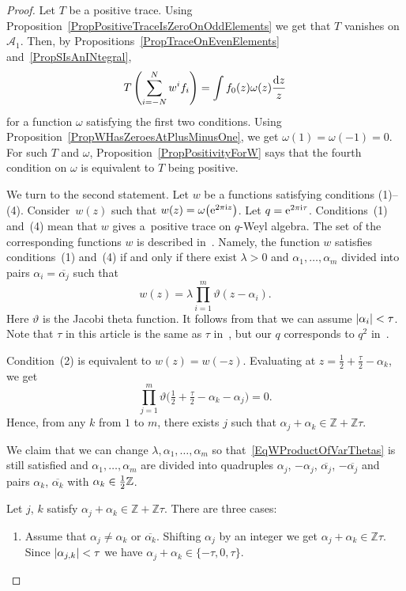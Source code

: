 \documentclass[pdftex]{sigma}
\newcommand\ZZ{\mathbb{Z}}
\let\Re\relax
\DeclareMathOperator\Re{Re}
\let\Im\relax
\DeclareMathOperator\Im{Im}
\newcommand{\mc}{\mathcal}
\newcommand{\ovl}{\overline}
\numberwithin{equation}{section}
\theoremstyle{definition}
\begin{document}
 \begin{proof}
 Let $T$ be a positive trace. Using Proposition~\ref{PropPositiveTraceIsZeroOnOddElements} we get that $T$ vanishes on $\mc{A}_1$. Then, by Propositions~\ref{PropTraceOnEvenElements} and~\ref{PropSIsAnINtegral},
 \[T\left(\sum_{i=-N}^N w^i f_i\right)=\int f_0(z)\omega(z)\frac{{\rm d}z}{z}\] for a function $\omega$ satisfying the first two conditions. Using Proposition~\ref{PropWHasZeroesAtPlusMinusOne}, we get $\omega(1)={\omega(-1)=0}$. For such $T$ and $\omega$, Proposition~\ref{PropPositivityForW} says that the fourth condition on $\omega$ is equivalent to $T$ being positive.

 We turn to the second statement. Let $w$ be a functions satisfying conditions (1)--(4). Consider~$w(z)$ such that $w(z)=\omega\bigl({\rm e}^{2\pi {\rm i} z}\bigr)$. Let $q={\rm e}^{2\pi {\rm i}\tau}$. Conditions~(1) and~(4) mean that $w$ gives a~positive trace on $q$-Weyl algebra. The set of the corresponding functions $w$ is described in~\cite[Theorem~3.7]{KQWeyl}. Namely, the function $w$ satisfies conditions~(1) and~(4) if and only if there exist $\lambda>0$ and $\alpha_1,\ldots, \alpha_m$ divided into pairs $\alpha_i=\ovl{\alpha_j}$ such that
 \begin{equation}
 \label{EqWProductOfVarThetas}
 w(z)=\lambda\prod_{i=1}^m \vartheta(z-\alpha_i).
 \end{equation} Here $\vartheta$ is the Jacobi theta function. It follows from \cite[Lemma 3.6]{KQWeyl} that we can assume $\lvert\Im\alpha_i\rvert<\Im\tau$. Note that $\tau$ in this article is the same as $\tau$ in~\cite{KQWeyl}, but our $q$ corresponds to $q^2$ in~\cite{KQWeyl}.

Condition~(2) is equivalent to $w(z)=w(-z)$. Evaluating at $z=\tfrac12+\tfrac{\tau}{2}-\alpha_k$, we get
\[
\prod_{j=1}^m \vartheta\bigl(\tfrac12+\tfrac{\tau}{2}-\alpha_k-\alpha_j\bigr)=0.
\]
 Hence, from any $k$ from $1$ to $m$, there exists $j$ such that $\alpha_j+\alpha_k\in \ZZ+\ZZ\tau$.

We claim that we can change $\lambda,\alpha_1,\ldots,\alpha_m$ so that~\eqref{EqWProductOfVarThetas} is still satisfied and $\alpha_1,\ldots,\alpha_m$ are divided into quadruples $\alpha_j$, $-\alpha_j$, $\ovl{\alpha_j}$, $-\ovl{\alpha_j}$ and pairs $\alpha_k$, $\ovl{\alpha_k}$ with $\Re\alpha_k\in\tfrac12\ZZ$.

 Let $j$, $k$ satisfy $\alpha_j+\alpha_k\in \ZZ+\ZZ\tau$. There are three cases:
 \begin{enumerate}\itemsep=0pt
 \item[$(1)$]
Assume that $\alpha_j\neq \alpha_k$ or $\ovl{\alpha_k}$. Shifting $\alpha_j$ by an integer we get $\alpha_j+\alpha_k\in\ZZ\tau$. Since $\lvert\Im\alpha_{j,k}\rvert<\Im\tau$ we have $\alpha_j+\alpha_k\in\{-\tau,0,\tau\}$.


\end{enumerate}
\end{proof}
\end{document}
